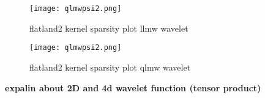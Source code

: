\begin{figure}[tbh]
\centering{}
\captionsetup{justification=centering}
\texttt{[image: qlmwpsi2.png]}
\caption{\label{fig:replacethis10}flatland2  kernel sparsity plot  llmw wavelet}
\end{figure}

\begin{figure}[tbh]
\centering{}
\captionsetup{justification=centering}
\texttt{[image: qlmwpsi2.png]}
\caption{\label{fig:replacethis11}flatland2 kernel sparsity plot qlmw wavelet}
\end{figure}

{\bf expalin about 2D and 4d wavelet function (tensor product)}